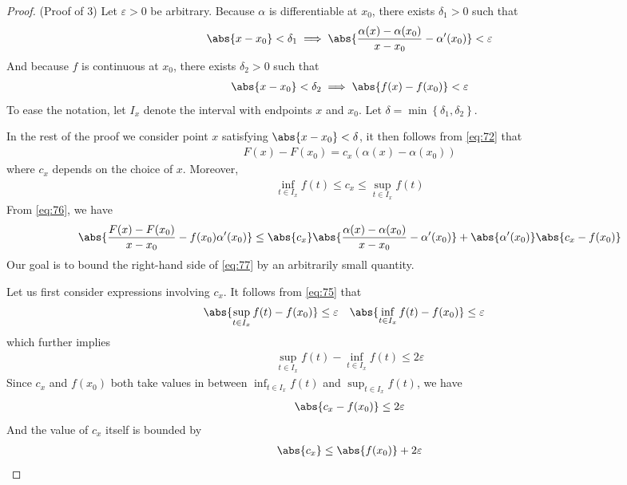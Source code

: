 \documentclass[thmcnt=section, 12pt]{elegantbook}
\begin{document}
\begin{proof}
    \par (Proof of 3) Let $\varepsilon > 0$ be arbitrary. Because $\alpha$ is differentiable at $x_0$, there exists $\delta_1 > 0$ such that 
    \begin{align}
        \abs{x - x_0} < \delta_1
        \implies \abs{\frac{\alpha(x) - \alpha(x_0)}{x - x_0} - \alpha^\prime(x_0)} < \varepsilon
        \label{eq:74}
    \end{align}
    And because $f$ is continuous at $x_0$, there exists $\delta_2 > 0$ such that 
    \begin{align}
        \abs{x - x_0} < \delta_2
        \implies \abs{f(x) - f(x_0)} < \varepsilon
        \label{eq:75}
    \end{align}
    To ease the notation, let $I_x$ denote the interval with endpoints $x$ and $x_0$. Let $\delta = \min\left\{\delta_1, \delta_2\right\}$. 
    
    \par In the rest of the proof we consider point $x$ satisfying $\abs{x - x_0} < \delta$, it then follows from \eqref{eq:72} that 
    \begin{align}
        F(x) - F(x_0)
        = c_x (\alpha(x) - \alpha(x_0))
        \label{eq:76}
    \end{align}
    where $c_x$ depends on the choice of $x$. Moreover, 
    \begin{align*}
        \inf_{t \in I_x} f(t) \leq c_x \leq \sup_{t\in I_x} f(t)
    \end{align*}
    From \eqref{eq:76}, we have 
    \begin{align}
        \abs{
            \frac{F(x) - F(x_0)}{x - x_0}
            - f(x_0) \alpha^\prime(x_0)
        } \leq \abs{
            c_x
        } \abs{
            \frac{\alpha(x) - \alpha(x_0)}{x - x_0}
            - \alpha^\prime(x_0)
        } + \abs{
            \alpha^\prime(x_0)
        } \abs{
            c_x - f(x_0)
        }
        \label{eq:77}
    \end{align}
    Our goal is to bound the right-hand side of \eqref{eq:77} by an arbitrarily small quantity.
    \par Let us first consider expressions involving $c_x$. It follows from \eqref{eq:75} that 
    \begin{align*}
        \abs{\sup_{t \in I_x}f(t) - f(x_0)} &\leq \varepsilon &
        \abs{\inf_{t \in I_x}f(t) - f(x_0)} &\leq \varepsilon
    \end{align*}
    which further implies
    \begin{align*}
        \sup_{t \in I_x}f(t)
        - \inf_{t \in I_x}f(t) \leq 2\varepsilon
    \end{align*}
    Since $c_x$ and $f(x_0)$ both take values in between $\inf_{t \in I_x}f(t)$ and $\sup_{t \in I_x}f(t)$, we have 
    \begin{align}
        \abs{c_x - f(x_0)} \leq 2\varepsilon
        \label{eq:78}
    \end{align}
    And the value of $c_x$ itself is bounded by 
    \begin{align}
        \abs{c_x} \leq \abs{f(x_0)} + 2\varepsilon
        \label{eq:79}
    \end{align}


\end{proof}
\end{document}
